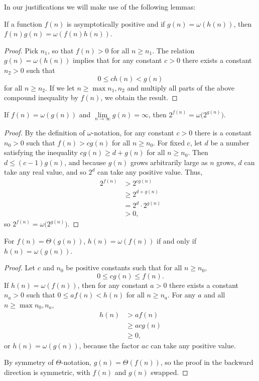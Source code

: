 In our justifications we will make use of the following lemmas:
\begin{numberedlemma} \label{thm:omega-of-product}
    If a function $f(n)$ is asymptotically positive and if $g(n)=\omega(h(n))$, then $f(n)g(n)=\omega(f(n)h(n))$.
\end{numberedlemma}

\begin{proof}
    Pick $n_1$, so that $f(n)>0$ for all $n\ge n_1$.
    The relation $g(n)=\omega(h(n))$ implies that for any constant $c>0$ there exists a constant $n_2>0$ such that
    \[
        0 \le ch(n) < g(n)
    \]
    for all $n\ge n_2$.
    If we let $n\ge\max{n_1,n_2}$ and multiply all parts of the above compound inequality by $f(n)$, we obtain the result.
\end{proof}

\begin{numberedlemma} \label{thm:omega-of-power}
    If $f(n)=\omega(g(n))$ and $\lim\limits_{n\to\infty}g(n)=\infty$, then $2^{f(n)}=\omega\bigl(2^{g(n)}\bigr)$.
\end{numberedlemma}

\begin{proof}
    By the definition of $\omega$-notation, for any constant $c>0$ there is a constant $n_0>0$ such that $f(n)>cg(n)$ for all $n\ge n_0$.
    For fixed $c$, let $d$ be a number satisfying the inequality $cg(n)\ge d+g(n)$ for all $n\ge n_0$.
    Then $d\le(c-1)g(n)$, and because $g(n)$ grows arbitrarily large as $n$ grows, $d$ can take any real value, and so $2^d$ can take any positive value.
    Thus,
    \begin{align*}
        2^{f(n)} &> 2^{cg(n)} \\
        &\ge 2^{d+g(n)} \\
        &= 2^d\cdot2^{g(n)} \\
        &> 0,
    \end{align*}
    so $2^{f(n)}=\omega\bigl(2^{g(n)}\bigr)$.
\end{proof}

\begin{numberedlemma} \label{thm:omega-of-symmetry}
    For $f(n)=\Theta(g(n))$, $h(n)=\omega(f(n))$ if and only if $h(n)=\omega(g(n))$.
\end{numberedlemma}

\begin{proof}
    Let $c$ and $n_0$ be positive constants such that for all $n\ge n_0$,
    \[
        0 \le cg(n) \le f(n).
    \]
    If $h(n)=\omega(f(n))$, then for any constant $a>0$ there exists a constant $n_a>0$ such that $0\le af(n)<h(n)$ for all $n\ge n_a$.
    For any $a$ and all $n\ge\max{n_0,n_a}$,
    \begin{align*}
        h(n) &> af(n) \\
        &\ge acg(n) \\
        &\ge 0,
    \end{align*}
    or $h(n)=\omega(g(n))$, because the factor $ac$ can take any positive value.

    By symmetry of $\Theta$-notation, $g(n)=\Theta(f(n))$, so the proof in the backward direction is symmetric, with $f(n)$ and $g(n)$ swapped.
\end{proof}

